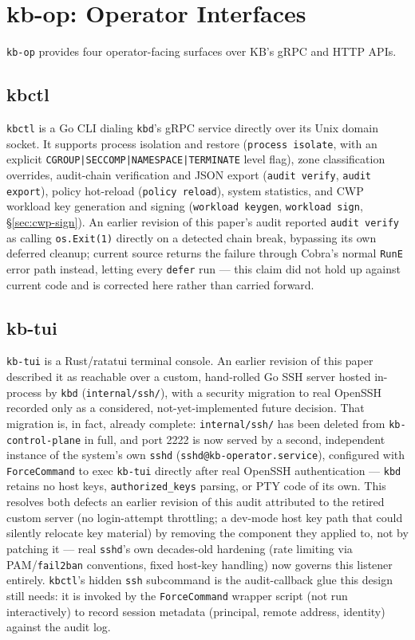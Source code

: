 \documentclass{article}
\begin{document}
\section{kb-op: Operator Interfaces}
\label{sec:op}

\texttt{kb-op} provides four operator-facing surfaces over KB's gRPC
and HTTP APIs.

\subsection{kbctl}

\texttt{kbctl} is a Go CLI dialing \texttt{kbd}'s gRPC service directly
over its Unix domain socket. It supports process isolation and restore
(\texttt{process isolate}, with an explicit
\texttt{CGROUP|SECCOMP|NAMESPACE|TERMINATE} level flag), zone
classification overrides, audit-chain verification and JSON export
(\texttt{audit verify}, \texttt{audit export}), policy hot-reload
(\texttt{policy reload}), system statistics, and CWP workload key
generation and signing (\texttt{workload keygen}, \texttt{workload
sign}, \S\ref{sec:cwp-sign}). An earlier revision of this paper's audit
reported \texttt{audit verify} as calling \texttt{os.Exit(1)} directly
on a detected chain break, bypassing its own deferred cleanup; current
source returns the failure through Cobra's normal \texttt{RunE} error
path instead, letting every \texttt{defer} run --- this claim did not
hold up against current code and is corrected here rather than carried
forward.

\subsection{kb-tui}

\texttt{kb-tui} is a Rust/ratatui terminal console. An earlier revision
of this paper described it as reachable over a custom, hand-rolled Go
SSH server hosted in-process by \texttt{kbd} (\texttt{internal/ssh/}),
with a security migration to real OpenSSH recorded only as a
considered, not-yet-implemented future decision. That migration is, in
fact, already complete: \texttt{internal/ssh/} has been deleted from
\texttt{kb-control-plane} in full, and port 2222 is now served by a
second, independent instance of the system's own \texttt{sshd}
(\texttt{sshd@kb-operator.service}), configured with
\texttt{ForceCommand} to exec \texttt{kb-tui} directly after real
OpenSSH authentication --- \texttt{kbd} retains no host keys,
\texttt{authorized\_keys} parsing, or PTY code of its own. This
resolves both defects an earlier revision of this audit attributed to
the retired custom server (no login-attempt throttling; a dev-mode host
key path that could silently relocate key material) by removing the
component they applied to, not by patching it --- real \texttt{sshd}'s
own decades-old hardening (rate limiting via PAM/\texttt{fail2ban}
conventions, fixed host-key handling) now governs this listener
entirely. \texttt{kbctl}'s hidden \texttt{ssh} subcommand is the
audit-callback glue this design still needs: it is invoked by the
\texttt{ForceCommand} wrapper script (not run interactively) to record
session metadata (principal, remote address, identity) against the
audit log.
\end{document}
